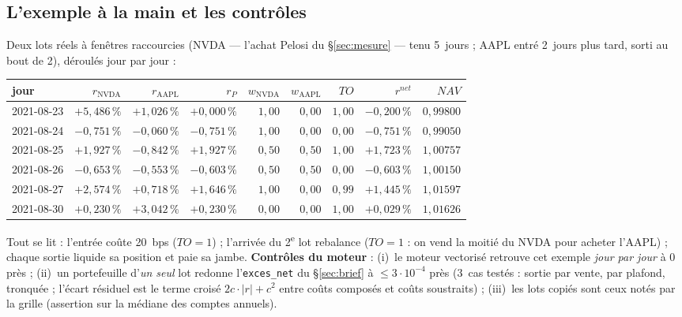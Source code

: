 \documentclass[11pt,a4paper]{article}
\newcommand{\code}[1]{\texttt{\small #1}}
\begin{document}
\subsection{L'exemple à la main et les contrôles}
Deux lots réels à fenêtres raccourcies (NVDA --- l'achat Pelosi du \S\ref{sec:mesure} --- tenu 5~jours ;
AAPL entré 2~jours plus tard, sorti au bout de 2), déroulés jour par jour :

\begin{center}\small
\begin{tabular}{lrrrrrrrr}
\toprule
jour & $r_{\text{NVDA}}$ & $r_{\text{AAPL}}$ & $r_P$ & $w_{\text{NVDA}}$ & $w_{\text{AAPL}}$ & $TO$ & $r^{net}$ & $NAV$ \\
\midrule
2021-08-23 & $+5{,}486\,\%$ & $+1{,}026\,\%$ & $+0{,}000\,\%$ & $1{,}00$ & $0{,}00$ & $1{,}00$ & $-0{,}200\,\%$ & $0{,}99800$ \\
2021-08-24 & $-0{,}751\,\%$ & $-0{,}060\,\%$ & $-0{,}751\,\%$ & $1{,}00$ & $0{,}00$ & $0{,}00$ & $-0{,}751\,\%$ & $0{,}99050$ \\
2021-08-25 & $+1{,}927\,\%$ & $-0{,}842\,\%$ & $+1{,}927\,\%$ & $0{,}50$ & $0{,}50$ & $1{,}00$ & $+1{,}723\,\%$ & $1{,}00757$ \\
2021-08-26 & $-0{,}653\,\%$ & $-0{,}553\,\%$ & $-0{,}603\,\%$ & $0{,}50$ & $0{,}50$ & $0{,}00$ & $-0{,}603\,\%$ & $1{,}00150$ \\
2021-08-27 & $+2{,}574\,\%$ & $+0{,}718\,\%$ & $+1{,}646\,\%$ & $1{,}00$ & $0{,}00$ & $0{,}99$ & $+1{,}445\,\%$ & $1{,}01597$ \\
2021-08-30 & $+0{,}230\,\%$ & $+3{,}042\,\%$ & $+0{,}230\,\%$ & $0{,}00$ & $0{,}00$ & $1{,}00$ & $+0{,}029\,\%$ & $1{,}01626$ \\
\bottomrule
\end{tabular}
\end{center}

Tout se lit : l'entrée coûte 20~bps ($TO=1$) ; l'arrivée du 2\textsuperscript{e} lot rebalance ($TO=1$ :
on vend la moitié du NVDA pour acheter l'AAPL) ; chaque sortie liquide sa position et paie sa jambe.
\textbf{Contrôles du moteur} : (i)~le moteur vectorisé retrouve cet exemple \emph{jour par jour} à
$0$ près ; (ii)~un portefeuille d'\emph{un seul} lot redonne l'\code{exces\_net} du \S\ref{sec:brief} à
$\leq3\cdot10^{-4}$ près (3~cas testés : sortie par vente, par plafond, tronquée ; l'écart résiduel est le
terme croisé $2c\cdot|r|+c^2$ entre coûts composés et coûts soustraits) ; (iii)~les lots copiés sont
ceux notés par la grille (assertion sur la médiane des comptes annuels).
\end{document}
